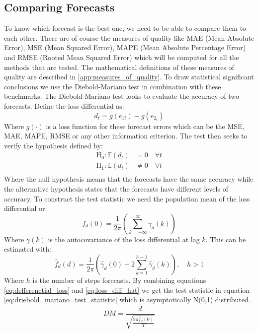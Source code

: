 \subsection{Comparing Forecasts}
To know which forecast is the best one, we need to be able to compare them to each other. There are of course the measures of quality like MAE (Mean Absolute Error), MSE (Mean Squared Error), MAPE (Mean Absolute Percentage Error) and RMSE (Rooted Mean Squared Error) which will be computed for all the methods that are tested. The mathematical definitions of these measures of quality are described in \autoref{app:measures_of_quality}. To draw statistical significant conclusions we use the Diebold-Mariano test \citep{Diebold1995ComparingAccuracy} in combination with these benchmarks. The Diebold-Mariano test looks to evaluate the accuracy of two forecasts. Define the loss differential as: 
\begin{equation}
    d_t = g(e_{1t}) - g(e_{2_t})
    \label{eq:defferenctial_loss}
\end{equation}
Where $g(\cdot)$ is a loss function for these forecast errors which can be the MSE, MAE, MAPE, RMSE or any other information criterion. The test then seeks to verify the hypothesis defined by:
\begin{equation*}
\begin{split}
    \text{H}_0 : \mathbb{E}(d_t) &= 0 \quad \forall t\\
    \text{H}_1 : \mathbb{E}(d_t) &\neq 0 \quad \forall t\\
\end{split}
\end{equation*}
Where the null hypothesis means that the forecasts have the same accuracy while the alternative hypothesis states that the forecasts have different levels of accuracy. To construct the test statistic we need the population mean of the loss differential or:
\begin{equation*}
    f_d(0) = \frac{1}{2\pi} \left(\sum\limits_{k=-\infty}^\infty \gamma_d(k)\right)
\end{equation*}
Where $\gamma(k)$ is the autocovariance of the loss differential at lag $k$. This can be estimated with:
\begin{equation}
    \hat{f}_d(d) = \frac{1}{2\pi} \left(\hat{\gamma}_d(0) + 2 \sum\limits_{k=1}^{h-1} \hat{\gamma}_d(k)\right), \quad h > 1
\label{eq:loss_diff_hat}
\end{equation}
Where $h$ is the number of steps forecasts. By combining equations \ref{eq:defferenctial_loss} and \ref{eq:loss_diff_hat} we get the test statistic in equation \ref{eq:driebold_mariano_test_statistic} which is asymptotically N(0,1) distributed.
\begin{equation}
    DM = \frac{\bar{d}}{\sqrt{\frac{2\pi\hat{f}_d(0)}{T}}}
    \label{eq:driebold_mariano_test_statistic}
\end{equation}